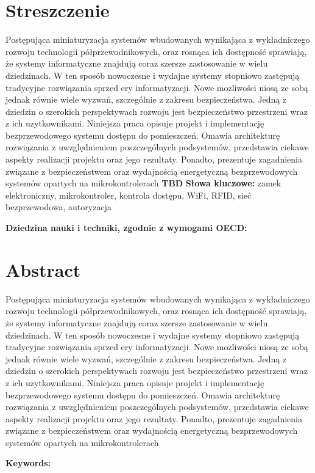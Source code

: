 \section*{Streszczenie}
	Postępująca miniaturyzacja systemów wbudowanych wynikająca z wykładniczego rozwoju technologii półprzewodnikowych, oraz rosnąca ich dostępność sprawiają, że systemy informatyczne znajdują coraz szersze zastosowanie w wielu dziedzinach. W ten sposób nowoczesne i wydajne systemy stopniowo zastępują tradycyjne rozwiązania sprzed ery informatyzacji. Nowe możliwości niosą ze sobą jednak równie wiele wyzwań, szczególnie z zakresu bezpieczeństwa. Jedną z dziedzin o szerokich perspektywach rozwoju jest bezpieczeństwo przestrzeni wraz z ich uzytkownikami. Niniejsza praca opisuje projekt i implementację bezprzewodowego systemu dostępu do pomieszczeń. Omawia architekturę rozwiązania z uwzględnieniem poszczególnych podsystemów, przedstawia ciekawe aspekty realizacji projektu oraz jego rezultaty. Ponadto, prezentuje zagadnienia związane z bezpieczeństwem oraz wydajnością energetyczną bezprzewodowych systemów opartych na mikrokontrolerach
	\textbf{TBD}
	\textbf{Słowa kluczowe:} zamek elektroniczny, mikrokontroler, kontrola dostępu, WiFi, RFID, sieć bezprzewodowa, autoryzacja

	\textbf{Dziedzina nauki i techniki, zgodnie z wymogami OECD:}

\section*{Abstract}
	Postępująca miniaturyzacja systemów wbudowanych wynikająca z wykładniczego rozwoju technologii półprzewodnikowych, oraz rosnąca ich dostępność sprawiają, że systemy informatyczne znajdują coraz szersze zastosowanie w wielu dziedzinach. W ten sposób nowoczesne i wydajne systemy stopniowo zastępują tradycyjne rozwiązania sprzed ery informatyzacji. Nowe możliwości niosą ze sobą jednak równie wiele wyzwań, szczególnie z zakresu bezpieczeństwa. Jedną z dziedzin o szerokich perspektywach rozwoju jest bezpieczeństwo przestrzeni wraz z ich uzytkownikami. Niniejsza praca opisuje projekt i implementację bezprzewodowego systemu dostępu do pomieszczeń. Omawia architekturę rozwiązania z uwzględnieniem poszczególnych podsystemów, przedstawia ciekawe aspekty realizacji projektu oraz jego rezultaty. Ponadto, prezentuje zagadnienia związane z bezpieczeństwem oraz wydajnością energetyczną bezprzewodowych systemów opartych na mikrokontrolerach

	\textbf{Keywords:}